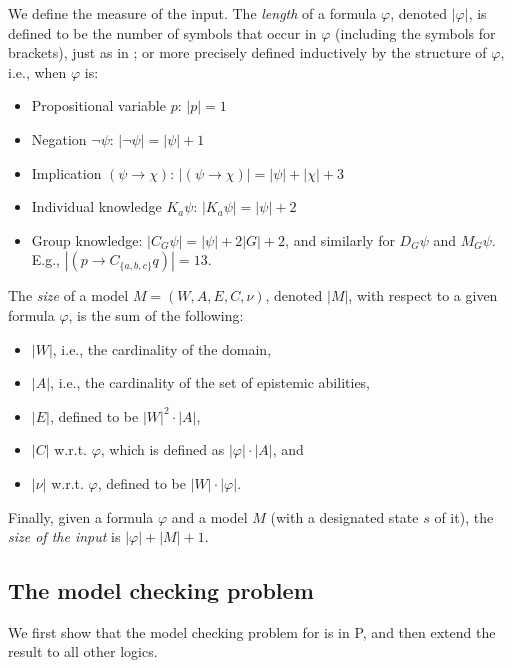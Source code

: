 \documentclass{article}
\newcommand{\ab}{\ensuremath{A}\xspace}
\renewcommand{\phi}{\varphi}
\newcommand{\ra}{\rightarrow}
\renewcommand{\l}{\text{\normalfont EL}\xspace}
\begin{document}
We define the measure of the input. The \emph{length} of a formula $\phi$, denoted $|\phi|$, is defined to be the number of symbols that occur in $\phi$ (including the symbols for brackets), just as in \cite[Section 3.1]{FHMV1995}; or more precisely defined inductively by the structure of $\phi$, i.e., when $\phi$ is:
\begin{itemize}
\item Propositional variable $p$: $|p| = 1$
\item Negation $\neg\psi$: $| \neg \psi | = |\psi| +1$
\item Implication $(\psi \ra \chi)$: $| (\psi \ra \chi) | = |\psi| + |\chi| + 3$
\item Individual knowledge $K_a \psi$: $|K_a\psi| = |\psi| + 2$
\item Group knowledge: $|C_G\psi| = |\psi| + 2|G| + 2$,  and similarly for $D_G \psi$ and $M_G\psi$. E.g., $| (p \ra C_{\{a,b,c\}} q) | = 13$.
\end{itemize}

The \emph{size} of a model $M = (W,\ab,E,C,\nu)$, denoted $|M|$, with respect to a given formula $\phi$, is the sum of the following:
\begin{itemize}
\item $|W|$, i.e., the cardinality of the domain,
\item $|\ab|$, i.e., the cardinality of the set of epistemic abilities,
\item $|E|$, defined to be $|W|^2 \cdot |\ab|$,
\item $|C|$ w.r.t. $\phi$, which is defined as $|\phi| \cdot |A|$, and
\item $|\nu|$ w.r.t. $\phi$, defined to be $|W| \cdot |\phi|$.
\end{itemize}

Finally, given a formula $\phi$ and a model $M$ (with a designated state $s$ of it), the \emph{size of the input} is $|\phi| + |M| + 1$.

\subsection{The model checking problem}
\label{sec:mc}

We first show that the model checking problem for \l is in P, and then extend the result to all other logics.
\end{document}
